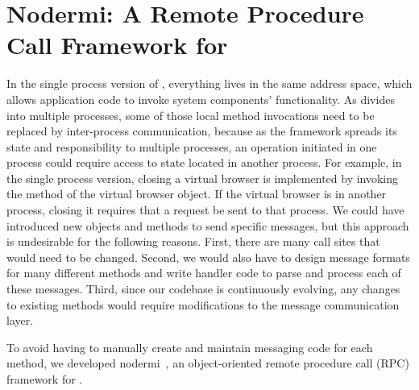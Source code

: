 \chapter{Nodermi: A Remote Procedure Call Framework for \nodejs{}}
\label{ch:rmi}
In the single process version of \cb,
everything lives in the same address space,
which allows application code to invoke system components' functionality.
As \cbtwo divides \cb into multiple processes,
some of those local method invocations need to be replaced by
inter-process communication,
because as the framework spreads its state
and responsibility to multiple processes,
an operation initiated in one process
could require access to state located in another process.
For example,
in the single process version,
closing a virtual browser
is implemented by invoking the  method of the virtual browser
object.
If the virtual browser is in another process, closing it requires that a request be sent to that process.
We could have introduced new objects and methods to send specific messages,
but this approach is undesirable for the following reasons.
First, there are many call sites that would need to be changed.
Second, we would also have to design message formats for many different methods and
write handler code to parse and process each of these messages.
Third, since our codebase is continuously evolving, any changes to existing methods
would require modifications to the message communication layer.

To avoid having to manually create and maintain messaging code for each
method, we developed nodermi~\cite{nodermi}, an object-oriented
remote procedure call (RPC) framework for \nodejs{}.

